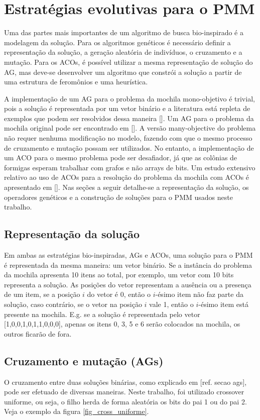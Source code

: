 \chapter[Estratégias evolutivas para o PMM]{Estratégias evolutivas para o PMM}

Uma das partes mais importantes de um algoritmo de busca bio-inspirado é a modelagem da solução. Para os algoritmos genéticos é necessário definir a representação da solução, a geração aleatória de indivíduos, o cruzamento e a mutação. Para os ACOs, é possível utilizar a mesma representação de solução do AG, mas deve-se desenvolver um algoritmo que constrói a solução a partir de uma estrutura de feromônios e uma heurística.

A implementação de um AG para o problema da mochila mono-objetivo é trivial, pois a solução é representada por um vetor binário e a literatura está repleta de exemplos que podem ser resolvidos dessa maneira []. Um AG para o problema da mochila original pode ser encontrado em []. A versão many-objective do problema não requer nenhuma modificação no modelo, fazendo com que o mesmo processo de cruzamento e mutação possam ser utilizados. No entanto, a implementação de um ACO para o mesmo problema pode ser desafiador, já que as colônias de formigas esperam trabalhar com grafos e não arrays de bits. Um estudo extensivo relativo ao uso de ACOs para a resolução do problema da mochila com ACOs é apresentado em []. Nas seções a seguir detalhe-se a representação da solução, os operadores genéticos e a construção de soluções para o PMM usados neste trabalho.

\section{Representação da solução}
Em ambas as estratégias bio-inspiradas, AGs e ACOs, uma solução para o PMM é representada da mesma maneira: um vetor binário. Se a instância do problema da mochila apresenta 10 itens ao total, por exemplo, um vetor com 10 bits representa a solução. As posições do vetor representam a ausência ou a presença de um item, se a posição $i$ do vetor é 0, então o $i$-ésimo item não faz parte da solução, caso contrário, se o vetor na posição $i$ vale 1, então o  $i$-ésimo item está presente na mochila. E.g. se a solução é representada pelo vetor [1,0,0,1,0,1,1,0,0,0], apenas os itens 0, 3, 5 e 6 serão colocados na mochila, os outros ficarão de fora.

\section{Cruzamento e mutação (AGs)}
O cruzamento entre duas soluções binárias, como explicado em [ref. secao ags], pode ser efetuado de diversas maneiras. Neste trabalho, foi utilizado crossover uniforme, ou seja, o filho herda de forma aleatória os bits do pai 1 ou do pai 2. Veja o exemplo da figura \ref{fig_cross_uniforme}.

